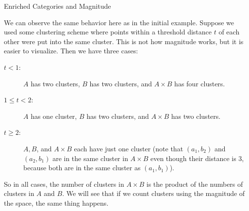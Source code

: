 \documentclass[12pt]{pom_thesis}
\begin{document}
\begin{chapter}{Enriched Categories and Magnitude}
\begin{examp}
We can observe the same behavior here as in the initial example. Suppose we used some clustering scheme where points within a threshold distance $t$ of each other were put into the same cluster. This is not how magnitude works, but it is easier to visualize. Then we have three cases:
\begin{description}
\item[$t < 1$:] $A$ has two clusters, $B$ has two clusters, and $A \times B$ has four clusters.
\item[$1 \leq t < 2$:] $A$ has one cluster, $B$ has two clusters, and $A \times B$ has two clusters.
\item[$t \geq 2$:] $A, B$, and $A \times B$ each have just one cluster (note that $(a_1, b_2)$ and $(a_2, b_1)$ are in the same cluster in $A \times B$ even though their distance is 3, because both are in the same cluster as $(a_1, b_1)$).
\end{description}
So in all cases, the number of clusters in $A \times B$ is the product of the numbers of clusters in $A$ and $B$. We will see that if we count clusters using the magnitude of the space, the same thing happens.
\end{examp}


\end{chapter}
\end{document}
